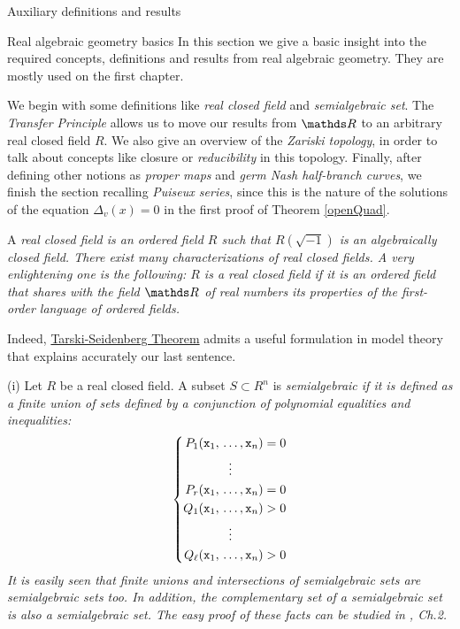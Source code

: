 \documentclass[11pt, a4paper, english, twoside, notitlepage, openright]{report}
\begin{document}
\appendix
\begin{chapter}{Auxiliary definitions and results}\label{AA}

\begin{section}{Real algebraic geometry basics}
In this section we give a basic insight into the required concepts, definitions and results from real algebraic geometry. They are mostly used on the first chapter.

We begin with some definitions like \emph{real closed field} and \emph{semialgebraic set}. The \emph{Transfer Principle} allows us to move our results from $\R$ to an arbitrary real closed field $R$. We also give an overview of the \emph{Zariski topology}, in order to talk about concepts like closure or \emph{reducibility} in this topology. Finally, after defining other notions as \emph{proper maps} and \emph{germ Nash half-branch curves}, we finish the section recalling \emph{Puiseux series}, since this is the nature of the solutions of the equation $\Delta_v(x)=0$ in the first proof of Theorem \ref{openQuad}.
\begin{definition}\label{realCField}
	A \em real closed field \em is an ordered field $R$ such that $R(\sqrt{-1})$ is an algebraically closed field. There exist many characterizations of real closed fields. A very enlightening one is the following: $R$ is a real closed field if it is an ordered field that shares with the field $\R$ of real numbers its properties of the first-order language of ordered fields. 
\end{definition}

Indeed, \hyperref[tarskiSeidenberg]{Tarski-Seidenberg Theorem} admits a useful formulation in model theory that explains accurately our last sentence.

\begin{definitions}\label{semialgSet} (i) Let $R$ be a real closed field. A subset $S\subset R^n$ is \em semialgebraic \em if it is defined as a finite union of sets defined by a conjunction of polynomial equalities and inequalities: 
	\begin{equation*}
	\left\{
	\begin{aligned}
		P_1({\tt x}_1,\, .\,&.\,.\,,{\tt x}_n)=0\\
		&\vdots\\
		P_r({\tt x}_1,\, .\,&.\,.\,,{\tt x}_n)=0\\
		Q_1({\tt x}_1,\, .\,&.\,.\,,{\tt x}_n)>0 \\
		&\vdots\\
		Q_{\ell}({\tt x}_1,\, .\,&.\,.\,,{\tt x}_n)>0\\
	\end{aligned}
	\right.
	\end{equation*}
It is easily seen that finite unions and intersections of semialgebraic sets are semialgebraic sets too. In addition, the complementary set of a semialgebraic set is also a semialgebraic set. The easy proof of these facts can be studied in \cite{bcr}, Ch.2.
	

\end{definitions}
\end{section}
\end{chapter}
\end{document}
